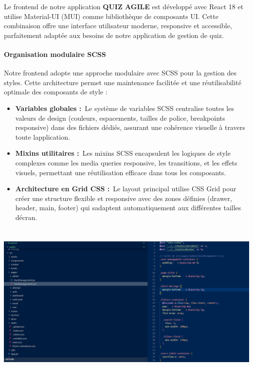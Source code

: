 \documentclass[12pt,a4paper,twoside,openright]{report}
\begin{document}
Le frontend de notre application \textbf{QUIZ AGILE} est développé avec
React 18 et utilise Material-UI (MUI) comme bibliothèque de composants
UI. Cette combinaison offre une interface utilisateur moderne,
responsive et accessible, parfaitement adaptée aux besoins de notre
application de gestion de quiz.

\hypertarget{organisation-modulaire-scss}{%
\paragraph{\texorpdfstring{ Organisation modulaire
SCSS}{ Organisation modulaire SCSS}}\label{organisation-modulaire-scss}}

Notre frontend adopte une approche modulaire avec SCSS pour la gestion
des styles. Cette architecture permet une maintenance facilitée et une
réutilisabilité optimale des composants de style :

\begin{itemize}
\item
  \textbf{Variables globales :}~Le système de variables SCSS centralise
  toutes les valeurs de design (couleurs, espacements, tailles de
  police, breakpoints responsive) dans des fichiers dédiés, assurant une
  cohérence visuelle à travers toute l\textquotesingle application.
\item
  \textbf{Mixins utilitaires :}~Les mixins SCSS encapsulent les logiques
  de style complexes comme les media queries responsive, les
  transitions, et les effets visuels, permettant une réutilisation
  efficace dans tous les composants.
\item
  \textbf{Architecture en Grid CSS :}~Le layout principal utilise CSS
  Grid pour créer une structure flexible et responsive avec des zones
  définies (drawer, header, main, footer) qui s\textquotesingle adaptent
  automatiquement aux différentes tailles d\textquotesingle écran.
\end{itemize}

\includegraphics[width=6.29921in,height=3.1063in]{latex_media/media/image50.png}
\end{document}
